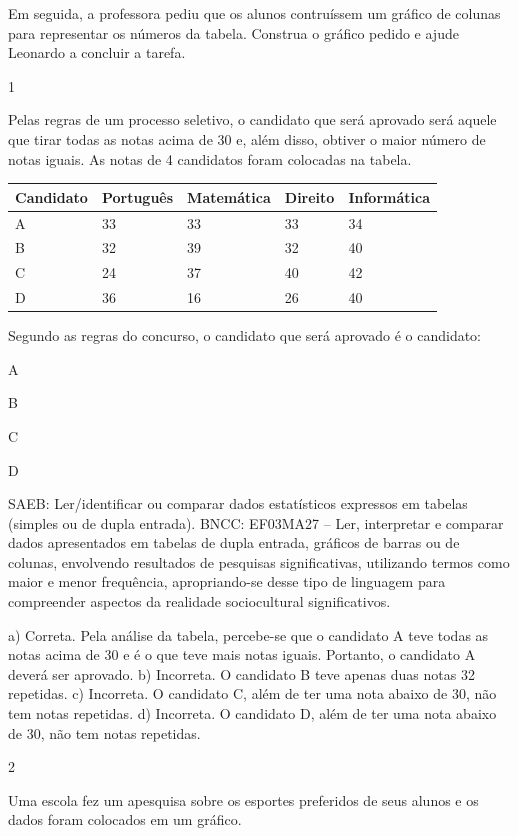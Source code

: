 \begin{multicols}{2}
{\begin{escolha}
{Em seguida, a professora pediu que os alunos contruíssem um gráfico de
colunas para representar os números da tabela. Construa o gráfico pedido
e ajude Leonardo a concluir a tarefa.



\num{1}

Pelas regras de um processo seletivo, o candidato que será aprovado será
aquele que tirar todas as notas acima de 30 e, além disso, obtiver o maior
número de notas iguais. As notas de 4 candidatos foram colocadas na
tabela.

\begin{longtable}[]{@{}lllll@{}}
\toprule
Candidato & Português & Matemática & Direito &
Informática\tabularnewline
\midrule
\endhead
A & 33 & 33 & 33 & 34\tabularnewline
B & 32 & 39 & 32 & 40\tabularnewline
C & 24 & 37 & 40 & 42\tabularnewline
D & 36 & 16 & 26 & 40\tabularnewline
\bottomrule
\end{longtable}

Segundo as regras do concurso, o candidato que será aprovado é o
candidato:

\begin{escolha}
\item
  A
\item
  B
\item
  C
\item
  D
\end{escolha}

SAEB: Ler/identificar ou comparar dados estatísticos expressos em tabelas (simples ou de dupla entrada). 
BNCC: EF03MA27 -- Ler, interpretar e comparar dados apresentados em tabelas de dupla entrada,
gráficos de barras ou de colunas, envolvendo resultados de pesquisas significativas, utilizando
termos como maior e menor frequência, apropriando-se desse tipo de linguagem para
compreender aspectos da realidade sociocultural significativos.


a) Correta. Pela análise da tabela, percebe-se que o candidato A teve todas as notas
acima de 30 e é o que teve mais notas iguais. Portanto, o candidato A
deverá ser aprovado.
b) Incorreta. O candidato B teve apenas duas notas 32 repetidas.
c) Incorreta. O candidato C, além de ter uma nota abaixo de 30, não tem notas repetidas.
d) Incorreta. O candidato D, além de ter uma nota abaixo de 30, não tem notas repetidas.

\num{2}

Uma escola fez um apesquisa sobre os esportes preferidos de seus alunos
e os dados foram colocados em um gráfico.

}
\end{escolha}}
\end{multicols}
